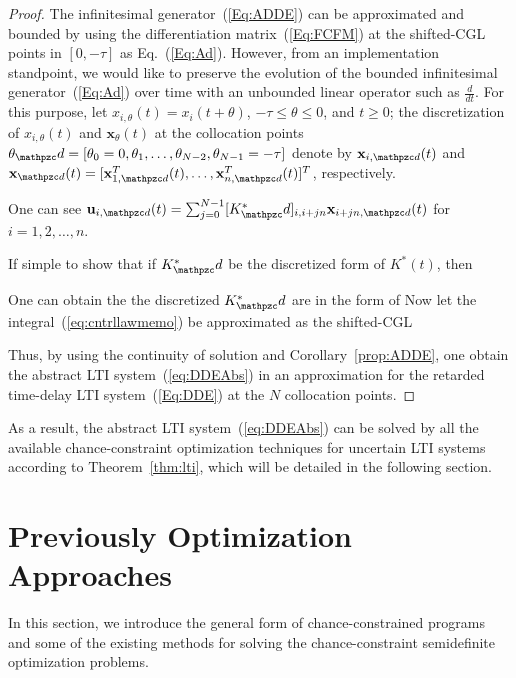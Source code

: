 \documentclass[journal]{IEEEtran}
\def \disc { \mathpzc d}
\begin{document}
\begin{proof}
	The infinitesimal generator~(\ref{Eq:ADDE}) can be approximated and bounded by using the differentiation matrix~(\ref{Eq:FCFM}) at the shifted-CGL points in $ [0,-\tau] $ as Eq.~(\ref{Eq:Ad}). However, from an implementation standpoint, we would like to preserve the evolution of the bounded infinitesimal generator~(\ref{Eq:Ad}) over time with an unbounded linear operator such as $ \frac{d}{dt} $. For this purpose, let $  x_{i,\theta}(t) = x_i(t+\theta)$, $ -\tau \leq \theta \leq 0$, and $ t\geq 0 $; the discretization of $  x_{i,\theta} (t) $ and $ \mathbf x_{\theta}(t) $ at the collocation points $ \mathbf \theta_\disc=[\theta_0=0,\theta_1,\ldots,\theta_{N-2},\theta_{N-1}=-\tau] $ denote by $ \mathbf x_{i,\disc}(t) $ and $ \mathbf x_{\disc}(t) =[\mathbf x_{1,\disc}^T(t) , \ldots, \mathbf x_{n,\disc}^T (t) ]^T$, respectively.


	One can see $ \mathbf u_{i,\disc}(t)=\sum_{j=0}^{N-1} [K^*_\disc]_{i,i+jn}\mathbf x_{i+jn,\disc}(t)$ for $ i=1,2,\ldots,n $.

	If simple to show that if $ K^*_\disc $ be the discretized form of $ K^*(t) $, then

	One can obtain the the discretized $ K^*_\disc $ are in the form of
	Now let the integral~(\ref{eq:cntrllawmemo}) be approximated as the shifted-CGL


	Thus, by using the continuity of solution and Corollary~\ref{prop:ADDE}, one obtain the abstract LTI system~(\ref{eq:DDEAbs}) in an approximation for the retarded time-delay LTI system~(\ref{Eq:DDE}) at the $ N $ collocation points.
\end{proof}

As a result, the abstract LTI system~(\ref{eq:DDEAbs}) can be solved by all the available chance-constraint optimization techniques for uncertain LTI systems according to Theorem~\ref{thm:lti}, which will be detailed in the following section.

\section{Previously Optimization Approaches} \label{sect:sect3}
In this section, we introduce the general form of chance-constrained programs and some of the existing methods for solving the chance-constraint semidefinite optimization problems.
\end{document}
